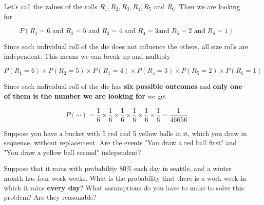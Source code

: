 %
\begin{frame}

Let's call the values of the rolls $R_1, R_2, R_3, R_4, R_5$ and $R_6$.  Then we
are looking for

$$P(R_1 = 6 \text{ and } R_2 = 5 \text{ and } R_3 = 4\text{ and } R_4 = 3 \text{
and } R_5 = 2 \text{ and } R_6 = 1)$$

Since each individual roll of the die does not influence the others, all size
rolls are independent.  This means we can break up and multiply

$$ P(R_1 = 6) \times P(R_2 = 5) \times P(R_3 = 4) \times P(R_4 = 3) \times P(R_5
= 2) \times P(R_6 = 1) $$

\end{frame}
%

%
\begin{frame}
Since each individual roll of the die has \textbf{six possible outcomes} and
\textbf{only one of them is the number we are looking for} we get

$$ P(\cdots) = \frac{1}{6} \times \frac{1}{6} \times \frac{1}{6} \times
\frac{1}{6} \times \frac{1}{6} \times \frac{1}{6} = \frac{1}{46656} $$
\end{frame}
%

%
\begin{frame}
Suppose you have a bucket with 5 red and 5 yellow balls in it, which you draw in
sequence, without replacement.  Are the events "You draw a red ball first" and 
"You draw a yellow ball second" independent?

Suppose that it rains with probability $80 \%$ each day in seattle, and a winter
month has four work weeks.  What is the probability that there is a work week in
which it rains \textbf{every day}?  What assumptions do you have to make to
solve this problem?  Are they reasonable?
\end{frame}
